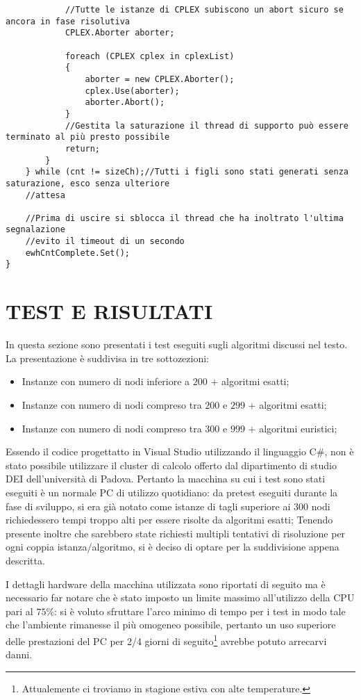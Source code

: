 \documentclass[11pt]{article}
\begin{document}
\begin{lstlisting}
            //Tutte le istanze di CPLEX subiscono un abort sicuro se ancora in fase risolutiva
            CPLEX.Aborter aborter;

            foreach (CPLEX cplex in cplexList)
            {
                aborter = new CPLEX.Aborter();
                cplex.Use(aborter);
                aborter.Abort();
            }
            //Gestita la saturazione il thread di supporto può essere terminato al più presto possibile
            return;
        }
    } while (cnt != sizeCh);//Tutti i figli sono stati generati senza saturazione, esco senza ulteriore
    //attesa
    
    //Prima di uscire si sblocca il thread che ha inoltrato l'ultima segnalazione
    //evito il timeout di un secondo
    ewhCntComplete.Set();
}

\end{lstlisting}

\section*{TEST E RISULTATI}
\label{sec:TestRisultatiS}

In questa sezione sono presentati i test eseguiti sugli algoritmi discussi nel testo. La presentazione è suddivisa in tre sottozezioni:
\begin{itemize}
    \item Instanze con numero di nodi inferiore a \textbf{$200$} $+$ algoritmi esatti;
    \item Instanze con numero di nodi compreso tra \textbf{$200$} e \textbf{$299$} $+$ algoritmi esatti;
    \item Instanze con numero di nodi compreso tra \textbf{$300$} e \textbf{$999$} $+$ algoritmi euristici;
\end{itemize}
Essendo il codice progettatto in Visual Studio utilizzando il linguaggio C\#, non è stato possibile utilizzare il cluster di calcolo offerto dal dipartimento di studio DEI dell'università di Padova. Pertanto la macchina su cui i test sono stati eseguiti è un normale PC di utilizzo quotidiano: da pretest eseguiti durante la fase di sviluppo, si era già notato come istanze di tagli superiore ai $300$ nodi richiedessero tempi troppo alti per essere risolte da algoritmi esatti; Tenendo presente inoltre che sarebbero state richiesti multipli tentativi di risoluzione per ogni coppia istanza/algoritmo, si è deciso di optare per la suddivisione appena descritta.

I dettagli hardware della macchina utilizzata sono riportati di seguito ma è necessario far notare che è stato imposto un limite massimo all'utilizzo della CPU pari al $75\%$: si è voluto sfruttare l'arco minimo di tempo per i test in modo tale che l'ambiente rimanesse il più omogeneo possibile, pertanto un uso superiore delle prestazioni del PC per 2/4 giorni di seguito\footnote{Attualemente ci troviamo in stagione estiva con alte temperature.} avrebbe potuto arrecarvi danni.
\end{document}
